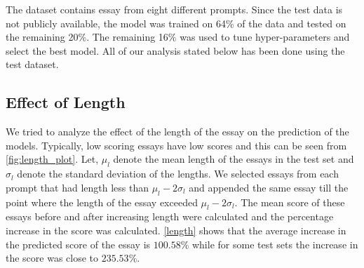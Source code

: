 \documentclass[11pt,a4paper]{article}
\begin{document}
The dataset contains essay from eight different prompts. Since the test data is not publicly available, the model was trained on 64\% of the data and tested on the remaining 20\%. The remaining 16\% was used to tune hyper-parameters and select the best model.
All of our analysis stated below has been done using the test dataset.

\subsection{Effect of Length}

We tried to analyze the effect of the length of the essay on the prediction of the models. Typically, low scoring essays have low scores and this can be seen from \cref{fig:length_plot}. Let, $\mu_l$ denote the mean length of the essays in the test set and $\sigma_l$ denote the standard deviation of the lengths. We selected essays from each prompt that had length less than $\mu_l - 2\sigma_l$ and appended the same essay till the point where the length of the essay exceeded $\mu_l - 2\sigma_l$. The mean score of these essays before and after increasing length were calculated and the percentage increase in the score was calculated. \cref{length} shows that the average increase in the predicted score of the essay is $100.58\%$ while for some test sets the increase in the score was close to $235.53\%$. 
\end{document}
